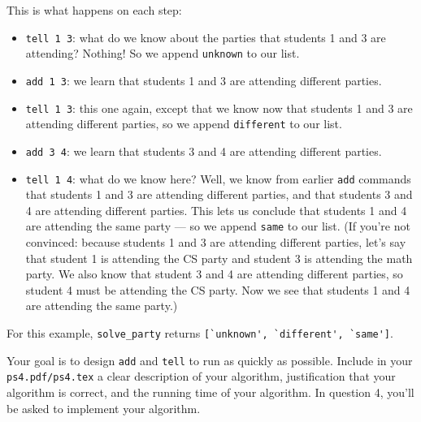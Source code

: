 \documentclass{assignment-263}
\begin{document}
\begin{enumerate}
This is what happens on each step:
\begin{itemize}
\item \verb|tell 1 3|: what do we know about the parties that students 1 and 3 are attending? Nothing! So we append \verb|unknown| to our list.
\item \verb|add 1 3|: we learn that students 1 and 3 are attending different parties.
\item \verb|tell 1 3|: this one again, except that we know now that students 1 and 3 are attending different parties, so we append \verb|different| to our list.
\item \verb|add 3 4|: we learn that students 3 and 4 are attending different parties.
\item \verb|tell 1 4|: what do we know here? Well, we know from earlier \verb|add| commands that students 1 and 3 are attending different parties, and that students 3 and 4 are attending different parties. This lets us conclude that students 1 and 4 are attending the same party --- so we append \verb|same| to our list.
(If you're not convinced: because students 1 and 3 are attending different parties, let's say that student 1 is attending the CS party and student 3 is attending the math party. We also know that student 3 and 4 are attending different parties, so student 4 must be attending the CS party. Now we see that students 1 and 4 are attending the same party.)
\end{itemize}

For this example, \verb|solve_party| returns \verb|[`unknown', `different', `same']|.
    
		Your goal is to design \verb|add| and \verb|tell| to run as quickly as possible. Include in your \verb|ps4.pdf/ps4.tex| a clear description of your algorithm, justification that your algorithm is correct, and the running time of your algorithm. 
		In question 4, you'll be asked to implement your algorithm.


\end{enumerate}
\end{document}
